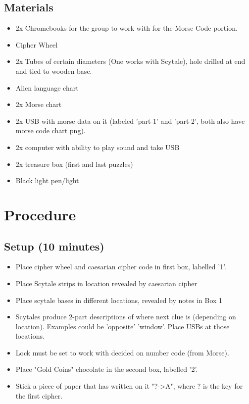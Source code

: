 \documentclass{lessonplan}
\begin{document}
    \subsection{Materials}
      \begin{itemize}
        \item 2x Chromebooks for the group to work with for the Morse Code portion.
        \item Cipher Wheel
        \item 2x Tubes of certain diameters (One works with Scytale), hole drilled at end and tied to wooden base.
        \item Alien language chart
        \item 2x Morse chart
        \item 2x USB with morse data on it (labeled 'part-1' and 'part-2', both also have morse code chart png).
        \item 2x computer with ability to play sound and take USB
        \item 2x treasure box (first and last puzzles)
        \item Black light pen/light
      \end{itemize}
  \section{Procedure}
    \subsection{Setup (10 minutes)}
      \begin{itemize}
        \item Place cipher wheel and caesarian cipher code in first box, labelled '1'.
        \item Place Scytale strips in location revealed by caesarian cipher
        \item Place scytale bases in different locations, revealed by notes in Box 1
        \item Scytales produce 2-part descriptions of where next clue is (depending on location).
            Examples could be 'opposite' 'window'. Place USBs at those locations.
        \item Lock must be set to work with decided on number code (from Morse).
        \item Place "Gold Coins" chocolate in the second box, labelled '2'. 
        \item Stick a piece of paper that has written on it "?->A", where ? is the key for the first cipher.
      \end{itemize}
\end{document}
